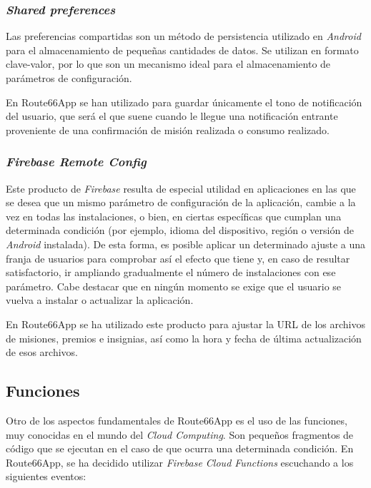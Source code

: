 \documentclass[twoside]{report}
\begin{document}
\subsubsection{\textit{Shared preferences}}

Las preferencias compartidas son un método de persistencia utilizado en \textit{Android} para el almacenamiento de pequeñas cantidades de datos. Se utilizan en formato clave-valor, por lo que son un mecanismo ideal para el almacenamiento de parámetros de configuración.

En Route66App se han utilizado para guardar únicamente el tono de notificación del usuario, que será el que suene cuando le llegue una notificación entrante proveniente de una confirmación de misión realizada o consumo realizado.

\subsubsection{\textit{Firebase Remote Config}}

Este producto de \textit{Firebase} resulta de especial utilidad en aplicaciones en las que se desea que un mismo parámetro de configuración de la aplicación, cambie a la vez en todas las instalaciones, o bien, en ciertas específicas que cumplan una determinada condición (por ejemplo, idioma del dispositivo, región o versión de \textit{Android} instalada). De esta forma, es posible aplicar un determinado ajuste a una franja de usuarios para comprobar así el efecto que tiene y, en caso de resultar satisfactorio, ir ampliando gradualmente el número de instalaciones con ese parámetro. Cabe destacar que en ningún momento se exige que el usuario se vuelva a instalar o actualizar la aplicación.

En Route66App se ha utilizado este producto para ajustar la URL de los archivos de misiones, premios e insignias, así como la hora y fecha de última actualización de esos archivos.

\subsection{Funciones}

Otro de los aspectos fundamentales de Route66App es el uso de las funciones, muy conocidas en el mundo del \textit{Cloud Computing}. Son pequeños fragmentos de código que se ejecutan en el caso de que ocurra una determinada condición. En Route66App, se ha decidido utilizar \textit{Firebase Cloud Functions} escuchando a los siguientes eventos:
\end{document}
